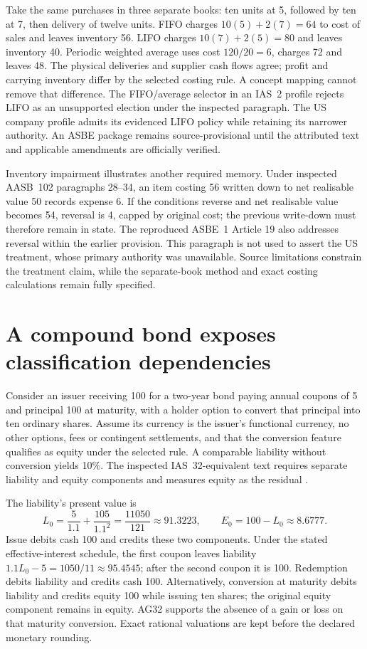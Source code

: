 Take the same purchases in three separate books: ten units at 5, followed by
ten at 7, then delivery of twelve units. FIFO charges $10(5)+2(7)=64$ to
cost of sales and leaves inventory 56. LIFO charges $10(7)+2(5)=80$ and
leaves inventory 40. Periodic weighted average uses cost $120/20=6$, charges
72 and leaves 48. The physical deliveries and supplier cash flows agree;
profit and carrying inventory differ by the selected costing rule. A concept
mapping cannot remove that difference. The FIFO/average selector in an
IAS~2 profile rejects LIFO as an unsupported election under the inspected
paragraph. The US company profile admits its evidenced LIFO policy while
retaining its narrower authority. An ASBE package remains source-provisional
until the attributed text and applicable amendments are officially verified.

Inventory impairment illustrates another required memory. Under inspected
AASB~102 paragraphs 28--34, an item costing 56 written down to net realisable
value 50 records expense 6. If the conditions reverse and net realisable
value becomes 54, reversal is 4, capped by original cost; the previous
write-down must therefore remain in state. The reproduced ASBE~1 Article 19
also addresses reversal within the earlier provision. This paragraph is not
used to assert the US treatment, whose primary authority was unavailable.
Source limitations constrain the treatment claim, while the separate-book
method and exact costing calculations remain fully specified.

\section{A compound bond exposes classification dependencies}

Consider an issuer receiving 100 for a two-year bond paying annual coupons of
5 and principal 100 at maturity, with a holder option to convert that principal
into ten ordinary shares. Assume its currency is the issuer's functional
currency, no other options, fees or contingent settlements, and that the
conversion feature qualifies as equity under the selected rule. A comparable
liability without conversion yields 10\%. The inspected IAS~32-equivalent
text requires separate liability and equity components and measures equity
as the residual \citep[paragraphs 28--32, AG30--AG32]{aasb132}.

The liability's present value is
\[
 L_0=\frac{5}{1.1}+\frac{105}{1.1^2}
     =\frac{11050}{121}\approx91.3223,
 \qquad E_0=100-L_0\approx8.6777.
\]
Issue debits cash 100 and credits these two components. Under the stated
effective-interest schedule, the first coupon leaves liability
$1.1L_0-5=1050/11\approx95.4545$; after the second coupon it is 100.
Redemption debits liability and credits cash 100. Alternatively, conversion
at maturity debits liability and credits equity 100 while issuing ten shares;
the original equity component remains in equity. AG32 supports the absence
of a gain or loss on that maturity conversion. Exact rational valuations are
kept before the declared monetary rounding.

